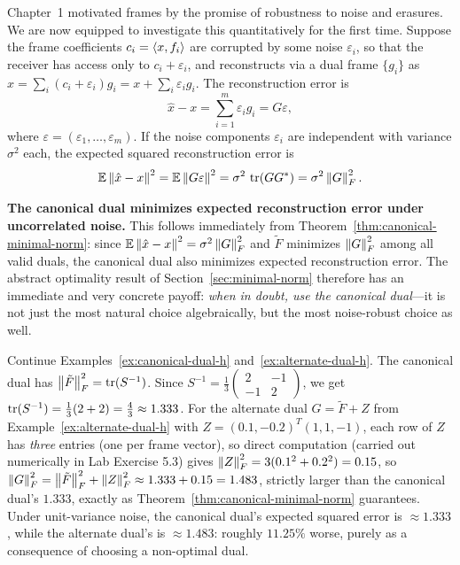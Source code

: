 Chapter~1 motivated frames by the promise of robustness to noise and
erasures. We are now equipped to investigate this quantitatively for the
first time. Suppose the frame coefficients $c_i = \left\langle x, f_i \right\rangle$ are
corrupted by some noise $\varepsilon_i$, so that the receiver has access
only to $c_i + \varepsilon_i$, and reconstructs via a dual frame
$\{g_i\}$ as $\hat x = \sum_i (c_i+\varepsilon_i) g_i = x +
\sum_i\varepsilon_i g_i$. The reconstruction error is
\[
  \hat x - x = \sum_{i=1}^m \varepsilon_i g_i = G\varepsilon,
\]
where $\varepsilon = (\varepsilon_1,\ldots,\varepsilon_m)$. If the noise
components $\varepsilon_i$ are independent with variance $\sigma^2$
each, the expected squared reconstruction error is
\[
  \mathbb{E}\left\| \hat x-x \right\|^2 = \mathbb{E}\left\| G\varepsilon \right\|^2
  = \sigma^2\,\operatorname{tr}(GG^*) = \sigma^2\left\| G \right\|_F^2.
\]

\begin{keyidea}
\textbf{The canonical dual minimizes expected reconstruction error under
uncorrelated noise.} This follows immediately from
Theorem~\ref{thm:canonical-minimal-norm}: since
$\mathbb{E}\left\| \hat x-x \right\|^2=\sigma^2\left\| G \right\|_F^2$ and $\tilde F$
minimizes $\left\| G \right\|_F^2$ among all valid duals, the canonical dual also
minimizes expected reconstruction error. The abstract optimality result
of Section~\ref{sec:minimal-norm} therefore has an immediate and very
concrete payoff: \emph{when in doubt, use the canonical dual}---it is
not just the most natural choice algebraically, but the most
noise-robust choice as well.
\end{keyidea}

\begin{examplebox}[title={Example 5.3: Numerically comparing canonical vs.\ alternate dual}]
\label{ex:stability-comparison}
Continue Examples~\ref{ex:canonical-dual-h} and~\ref{ex:alternate-dual-h}.
The canonical dual has $\left\| \tilde F \right\|_F^2 = \operatorname{tr}(S^{-1})$. Since
$S^{-1}=\tfrac13\begin{pmatrix}2&-1\\-1&2\end{pmatrix}$, we get
$\operatorname{tr}(S^{-1})=\tfrac13(2+2)=\tfrac43\approx1.333$. For the alternate dual
$G=\tilde F+Z$ from Example~\ref{ex:alternate-dual-h} with
$Z=(0.1,-0.2)^T(1,1,-1)$, each row of $Z$ has \emph{three} entries (one
per frame vector), so direct computation (carried out numerically in
Lab Exercise 5.3) gives
$\left\| Z \right\|_F^2=3(0.1^2+0.2^2)=0.15$, so
$\left\| G \right\|_F^2=\left\| \tilde F \right\|_F^2+\left\| Z \right\|_F^2\approx1.333+0.15=1.483$,
strictly larger than the canonical dual's $1.333$, exactly as
Theorem~\ref{thm:canonical-minimal-norm} guarantees. Under unit-variance
noise, the canonical dual's expected squared error is $\approx1.333$,
while the alternate dual's is $\approx1.483$: roughly $11.25\%$ worse,
purely as a consequence of choosing a non-optimal dual.
\end{examplebox}

